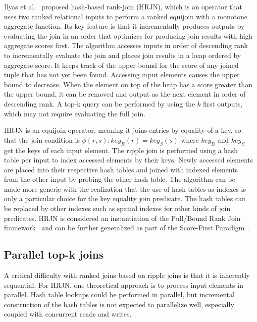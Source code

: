 Ilyas et al.~\cite{ilyas2004supporting} proposed hash-based rank-join (HRJN), which is an operator that uses two ranked relational inputs to perform a ranked equijoin with a monotone aggregate function. Its key feature is that it incrementally produces outputs by evaluating the join in an order that optimizes for producing join results with high aggregate scores first. The algorithm accesses inputs in order of descending rank to incrementally evaluate the join and places join results in a heap ordered by aggregate score. It keeps track of the upper bound for the score of any joined tuple that has not yet been found. Accessing input elements causes the upper bound to decrease. When the element on top of the heap has a score greater than the upper bound, it can be removed and output as the next element in order of descending rank. A top-k query can be performed by using the \(k\) first outputs, which may not require evaluating the full join.

HRJN is an equijoin operator, meaning it joins entries by equality of a key, so that the join condition is \(\phi(r, s) : key_R(r) = key_S(s)\) where \(key_R\) and \(key_S\) get the keys of each input element. The ripple join is performed using a hash table per input to index accessed elements by their keys. Newly accessed elements are placed into their respective hash tables and joined with indexed elements from the other input by probing the other hash table. The algorithm can be made more generic with the realization that the use of hash tables as indexes is only a particular choice for the key equality join predicate. The hash tables can be replaced by other indexes such as spatial indexes for other kinds of join predicates. HRJN is considered an instantiation of the Pull/Bound Rank Join framework~\cite{schnaitter2010optimal} and can be further generalized as part of the Score-First Paradigm~\cite{qi2015efficient}.

\subsection{Parallel top-k joins}

A critical difficulty with ranked joins based on ripple joins is that it is inherently sequential. For HRJN, one theoretical approach is to process input elements in parallel. Hash table lookups could be performed in parallel, but incremental construction of the hash tables is not expected to parallelize well, especially coupled with concurrent reads and writes.

